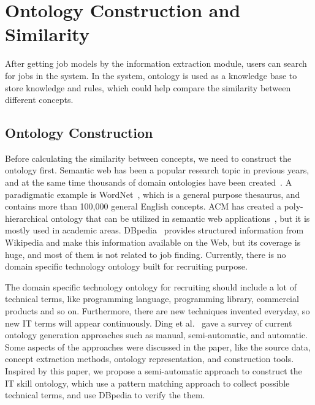 \section{Ontology Construction and Similarity}
\label{sec1}

After getting job models by the information extraction module, users can search for jobs in the system. In the system, ontology is used as a knowledge base to store knowledge and rules, which could help compare the similarity between different concepts.

\subsection{Ontology Construction}

Before calculating the similarity between concepts, we need to construct the ontology first. Semantic web has been a popular research topic in previous years, and at the same time thousands of domain ontologies have been created~\cite{ding2004swoogle}. A paradigmatic example is WordNet~\cite{fellbaum1998wordnet}, which is a general purpose thesaurus, and contains more than 100,000 general English concepts. ACM has created a poly-hierarchical ontology that can be utilized in semantic web applications~\cite{acm2012class}, but it is mostly used in academic areas. DBpedia~\cite{bizer2009dbpedia} provides structured information from Wikipedia and make this information available on the Web, but its coverage is huge, and most of them is not related to job finding. Currently, there is no domain specific technology ontology built for recruiting purpose.

The domain specific technology ontology for recruiting should include a lot of technical terms, like programming language, programming library, commercial products and so on. Furthermore, there are new techniques invented everyday, so new IT terms will appear continuously. Ding et al.~\cite{ding2002ontology} gave a survey of current ontology generation approaches such as manual, semi-automatic, and automatic. Some aspects of the approaches were discussed in the paper, like the source data, concept extraction methods, ontology representation, and construction tools. Inspired by this paper, we propose a semi-automatic approach to construct the IT skill ontology, which use a pattern matching approach to collect possible technical terms, and use DBpedia to verify the them.

